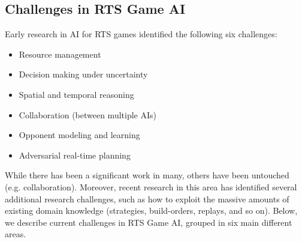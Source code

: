 \documentclass[journal]{IEEEtran}
\begin{document}





\subsection{Challenges in RTS Game AI}\label{subsec:challenges}

Early research in AI for RTS games \cite{Buro03rts} identified the following six challenges: 
\begin{itemize}
\item Resource management
\item Decision making under uncertainty
\item Spatial and temporal reasoning
\item Collaboration (between multiple AIs)
\item Opponent modeling and learning
\item Adversarial real-time planning
\end{itemize}

While there has been a significant work in many, others have been untouched (e.g. collaboration). Moreover, recent research in this area has identified several additional research challenges, such as how to exploit the massive amounts of existing domain knowledge (strategies, build-orders, replays, and so on). Below, we describe current challenges in RTS Game AI, grouped in six main different areas.
\end{document}

